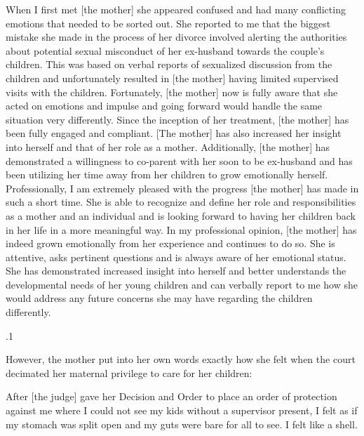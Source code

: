 \documentclass[11pt, twoside]{article}
\begin{document}
{{\begin{blockQuote}
When I first met [the mother] she appeared confused and had
many conflicting emotions that needed to be sorted out. She reported to me that the biggest mistake she made in the process
of her divorce involved alerting the authorities about potential
sexual misconduct of her ex-husband towards the couple’s children. This was based on verbal reports of sexualized discussion
from the children and unfortunately resulted in [the mother] having limited supervised visits with the children. Fortunately, [the
mother] now is fully aware that she acted on emotions and impulse and going forward would handle the same situation very
differently.
\parbreak{}
Since the inception of her treatment, [the mother] has been
fully engaged and compliant. [The mother] has also increased her
insight into herself and that of her role as a mother. Additionally,
[the mother] has demonstrated a willingness to co-parent with her
soon to be ex-husband and has been utilizing her time away from
her children to grow emotionally herself.
Professionally, I am extremely pleased with the progress [the
mother] has made in such a short time. She is able to recognize
and define her role and responsibilities as a mother and an individual and is looking forward to having her children back in her
life in a more meaningful way.
\parbreak{}
In my professional opinion, [the mother] has indeed grown
emotionally from her experience and continues to do so. She is
attentive, asks pertinent questions and is always aware of her emotional status. She has demonstrated increased insight into herself
and better understands the developmental needs of her young children and can verbally report to me how she would address any
future concerns she may have regarding the children differently.
\end{blockQuote}

}%

\p.1{%
However, the mother put into her own words exactly how she felt when
the court decimated her maternal privilege to care for her children:

\begin{blockQuote}
After [the judge] gave her Decision and Order to place an order
of protection against me where I could not see my kids without a
supervisor present, I felt as if my stomach was split open and my
guts were bare for all to see. I felt like a shell.
\end{blockQuote}

}%


}
\end{document}
